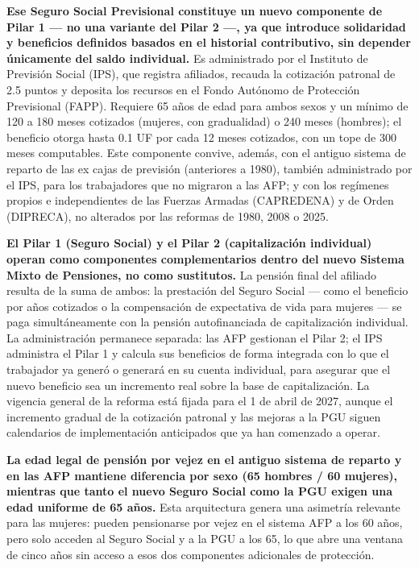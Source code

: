 \documentclass[12pt, letterpaper]{article}
\begin{document}
\textbf{Ese Seguro Social Previsional constituye un nuevo componente de Pilar 1 --- no una variante del Pilar 2 ---, ya que introduce solidaridad y beneficios definidos basados en el historial contributivo, sin depender únicamente del saldo individual.} Es administrado por el Instituto de Previsión Social (IPS), que registra afiliados, recauda la cotización patronal de 2.5 puntos y deposita los recursos en el Fondo Autónomo de Protección Previsional (FAPP). Requiere 65 años de edad para ambos sexos y un mínimo de 120 a 180 meses cotizados (mujeres, con gradualidad) o 240 meses (hombres); el beneficio otorga hasta 0.1 UF por cada 12 meses cotizados, con un tope de 300 meses computables. Este componente convive, además, con el antiguo sistema de reparto de las ex cajas de previsión (anteriores a 1980), también administrado por el IPS, para los trabajadores que no migraron a las AFP; y con los regímenes propios e independientes de las Fuerzas Armadas (CAPREDENA) y de Orden (DIPRECA), no alterados por las reformas de 1980, 2008 o 2025.

\textbf{El Pilar 1 (Seguro Social) y el Pilar 2 (capitalización individual) operan como componentes complementarios dentro del nuevo Sistema Mixto de Pensiones, no como sustitutos.} La pensión final del afiliado resulta de la suma de ambos: la prestación del Seguro Social --- como el beneficio por años cotizados o la compensación de expectativa de vida para mujeres --- se paga simultáneamente con la pensión autofinanciada de capitalización individual. La administración permanece separada: las AFP gestionan el Pilar 2; el IPS administra el Pilar 1 y calcula sus beneficios de forma integrada con lo que el trabajador ya generó o generará en su cuenta individual, para asegurar que el nuevo beneficio sea un incremento real sobre la base de capitalización. La vigencia general de la reforma está fijada para el 1 de abril de 2027, aunque el incremento gradual de la cotización patronal y las mejoras a la PGU siguen calendarios de implementación anticipados que ya han comenzado a operar.

\textbf{La edad legal de pensión por vejez en el antiguo sistema de reparto y en las AFP mantiene diferencia por sexo (65 hombres / 60 mujeres), mientras que tanto el nuevo Seguro Social como la PGU exigen una edad uniforme de 65 años.} Esta arquitectura genera una asimetría relevante para las mujeres: pueden pensionarse por vejez en el sistema AFP a los 60 años, pero solo acceden al Seguro Social y a la PGU a los 65, lo que abre una ventana de cinco años sin acceso a esos dos componentes adicionales de protección.
\end{document}
